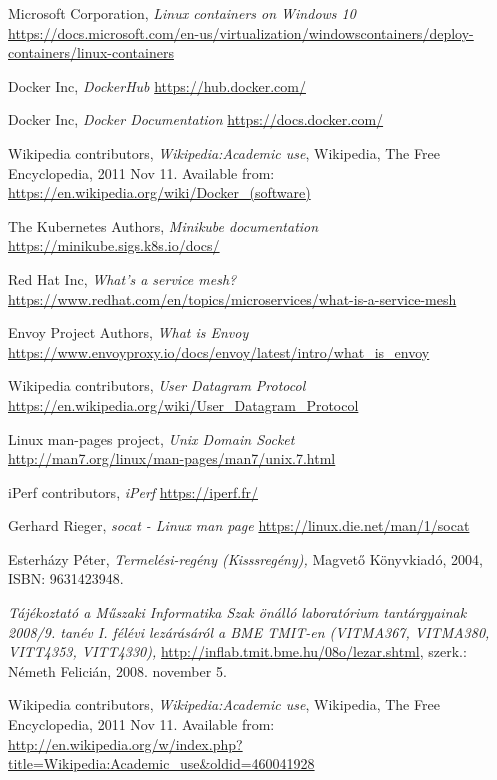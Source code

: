 \documentclass[a4paper,oneside]{article}
\begin{document}
\begin{thebibliography}{9}
\label{sec:tanulm-irod-jegyz}

 Microsoft Corporation, \emph{Linux containers on Windows 10} \\
\url{https://docs.microsoft.com/en-us/virtualization/windowscontainers/deploy-containers/linux-containers}

  Docker Inc, \emph{DockerHub} \url{https://hub.docker.com/}

  Docker Inc, \emph{Docker Documentation} \url{https://docs.docker.com/}

 Wikipedia contributors, \emph{Wikipedia:Academic
    use}, Wikipedia, The Free Encyclopedia, 2011 Nov 11.  Available
  from: \\ \url{https://en.wikipedia.org/wiki/Docker_(software)}

 The Kubernetes Authors, \emph{Minikube documentation} \url{https://minikube.sigs.k8s.io/docs/} 

 Red Hat Inc, \emph{What's a service mesh?} 
\\ \url{https://www.redhat.com/en/topics/microservices/what-is-a-service-mesh}

 Envoy Project Authors, \emph{What is Envoy} 
\\ \url{https://www.envoyproxy.io/docs/envoy/latest/intro/what_is_envoy}

 Wikipedia contributors, \emph{User Datagram Protocol}
\\ \url{https://en.wikipedia.org/wiki/User_Datagram_Protocol}

  Linux man-pages project, \emph{Unix Domain Socket}
\\ \url{http://man7.org/linux/man-pages/man7/unix.7.html}

  iPerf contributors, \emph{iPerf} \url{https://iperf.fr/}

  Gerhard Rieger, \emph{socat - Linux man page} \url{https://linux.die.net/man/1/socat}

 Esterházy Péter, \emph{Termelési-regény (Kisssregény),}
  Magvető Könyvkiadó, 2004, ISBN: 9631423948.

 \emph{Tájékoztató a Műszaki Informatika Szak önálló
    laboratórium tantárgyainak 2008/9. tanév I. félévi lezárásáról a
    BME TMIT-en (VITMA367, VITMA380, VITT4353, VITT4330),}
  \url{http://inflab.tmit.bme.hu/08o/lezar.shtml}, szerk.: Németh Felicián,
  2008. november 5.

 Wikipedia contributors, \emph{Wikipedia:Academic
    use}, Wikipedia, The Free Encyclopedia, 2011 Nov 11.  Available
  from: \\ \url{http://en.wikipedia.org/w/index.php?title=Wikipedia:Academic\_use\&oldid=460041928}

\end{thebibliography}
\end{document}
